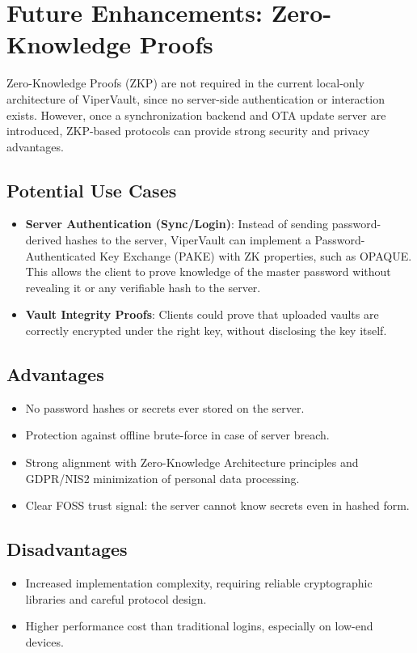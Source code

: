 \section{Future Enhancements: Zero-Knowledge Proofs}
	
	Zero-Knowledge Proofs (ZKP) are not required in the current local-only architecture of ViperVault, since no server-side authentication or interaction exists.
	However, once a synchronization backend and OTA update server are introduced, ZKP-based protocols can provide strong security and privacy advantages.
	
	\subsection{Potential Use Cases}
		\begin{itemize}
			\item \textbf{Server Authentication (Sync/Login)}: Instead of sending password-derived hashes to the server, ViperVault can implement a Password-Authenticated Key Exchange (PAKE) with ZK properties, such as OPAQUE.
			This allows the client to prove knowledge of the master password without revealing it or any verifiable hash to the server.
			\item \textbf{Vault Integrity Proofs}: Clients could prove that uploaded vaults are correctly encrypted under the right key, without disclosing the key itself.
		\end{itemize}
	
	\subsection{Advantages}
		\begin{itemize}
			\item No password hashes or secrets ever stored on the server.
			\item Protection against offline brute-force in case of server breach.
			\item Strong alignment with Zero-Knowledge Architecture principles and GDPR/NIS2 minimization of personal data processing.
			\item Clear FOSS trust signal: the server cannot know secrets even in hashed form.
		\end{itemize}
	
	\subsection{Disadvantages}
		\begin{itemize}
			\item Increased implementation complexity, requiring reliable cryptographic libraries and careful protocol design.
			\item Higher performance cost than traditional logins, especially on low-end devices.
		\end{itemize}